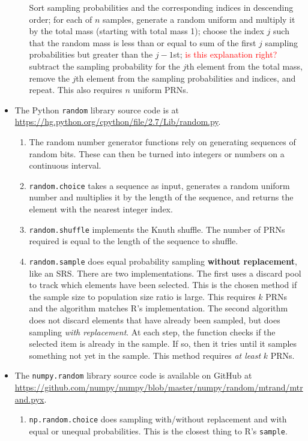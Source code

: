 \documentclass[12pt]{article}
\begin{document}
\begin{itemize}
\begin{enumerate}
Sort sampling probabilities and the corresponding indices in descending order; 
for each of $n$ samples, generate a random uniform and multiply it by the total mass (starting with total mass 1);
choose the index $j$ such that the random mass is less than or equal to sum of the first $j$ sampling probabilities but greater than the $j-1$st; \textcolor{red}{is this explanation right?}
subtract the sampling probability for the $j$th element from the total mass, remove the $j$th element from the sampling probabilities and indices, and repeat.
This also requires $n$ uniform PRNs.
\end{enumerate}
\item The Python \texttt{random} library source code is at \url{https://hg.python.org/cpython/file/2.7/Lib/random.py}.
\begin{enumerate}
\item The random number generator functions rely on generating sequences of random bits.
These can then be turned into integers or numbers on a continuous interval.
\item \texttt{random.choice} takes a sequence as input, generates a random uniform number and multiplies it by the length of the sequence, and returns the element with the nearest integer index.
\item \texttt{random.shuffle} implements the Knuth shuffle. 
The number of PRNs required is equal to the length of the sequence to shuffle.
\item \texttt{random.sample} does equal probability sampling \textbf{without replacement}, like an SRS.
There are two implementations.
The first uses a discard pool to track which elements have been selected.
This is the chosen method if the sample size to population size ratio is large.
This requires $k$ PRNs and the algorithm matches R's implementation.
The second algorithm does not discard elements that have already been sampled, but does sampling \textit{with replacement}.
At each step, the function checks if the selected item is already in the sample.
If so, then it tries until it samples something not yet in the sample.
This method requires \textit{at least} $k$ PRNs.
\end{enumerate}
\item The \texttt{numpy.random} library source code is available on GitHub at \url{https://github.com/numpy/numpy/blob/master/numpy/random/mtrand/mtrand.pyx}.
\begin{enumerate}
\item \texttt{np.random.choice} does sampling with/without replacement and with equal or unequal probabilities.
This is the closest thing to R's \texttt{sample}.
\begin{enumerate}


\end{enumerate}
\end{enumerate}
\end{itemize}
\end{document}
